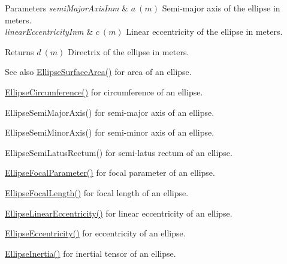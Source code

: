 \begin{DoxyParams}{Parameters}
{\em semi\+Major\+Axis\+Inm} & $ a\ (m)$ Semi-\/major axis of the ellipse in meters. \\
\hline
{\em linear\+Eccentricity\+Inm} & $ c\ (m)$ Linear eccentricity of the ellipse in meters. \\
\hline
\end{DoxyParams}
\begin{DoxyReturn}{Returns}
$ d\ (m)$ Directrix of the ellipse in meters. 
\end{DoxyReturn}
\begin{DoxySeeAlso}{See also}
\mbox{\hyperlink{group___e_g_x_math-_geometry-2_d-_ellipse-_surface_area_ga4ce8c8323e9718ce5458f4ab7f6d823d}{Ellipse\+Surface\+Area()}} for area of an ellipse. 

\mbox{\hyperlink{group___e_g_x_math-_geometry-2_d-_ellipse-_circumference_ga4172802ac674eb53467b44928ac635c7}{Ellipse\+Circumference()}} for circumference of an ellipse. 

Ellipse\+Semi\+Major\+Axis() for semi-\/major axis of an ellipse. 

Ellipse\+Semi\+Minor\+Axis() for semi-\/minor axis of an ellipse. 

Ellipse\+Semi\+Latus\+Rectum() for semi-\/latus rectum of an ellipse. 

\mbox{\hyperlink{group___e_g_x_math-_geometry-2_d-_ellipse-_focal_parameter_ga4cd01a38c72c092ef9791351948bf69b}{Ellipse\+Focal\+Parameter()}} for focal parameter of an ellipse. 

\mbox{\hyperlink{group___e_g_x_math-_geometry-2_d-_ellipse-_focal_length_gab8d63de7640c880cfecaeada6f2afdac}{Ellipse\+Focal\+Length()}} for focal length of an ellipse. 

\mbox{\hyperlink{group___e_g_x_math-_geometry-2_d-_ellipse-_linear_eccentricity_gac70b3010e30aa8b73deb50fe2b9b9a91}{Ellipse\+Linear\+Eccentricity()}} for linear eccentricity of an ellipse. 

\mbox{\hyperlink{group___e_g_x_math-_geometry-2_d-_ellipse-_eccentricity_ga6a0a7fba17f782616894cfc447628c33}{Ellipse\+Eccentricity()}} for eccentricity of an ellipse. 

\mbox{\hyperlink{group___e_g_x_math-_geometry-2_d-_ellipse-_inertia_ga10a3049c2f04b50f271fb01dc62e4cf8}{Ellipse\+Inertia()}} for inertial tensor of an ellipse. 
\end{DoxySeeAlso}
\mbox{\label{group___e_g_x_math-_geometry-2_d-_ellipse-_directrix_ga5e7a411cd0af17a30bae03613b4a675d}} 
